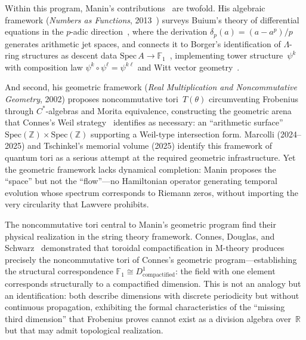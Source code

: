 Within this program, Manin's contributions~\cite{manin13,manin04} are
twofold.  His algebraic framework
(\emph{Numbers as Functions}, 2013~\cite{manin13}) surveys Buium's theory
of differential equations in the $p$-adic direction~\cite{buium05},
where the derivation $\delta_p(a) = (a - a^p)/p$ generates arithmetic
jet spaces, and connects it to Borger's identification of $\Lambda$-ring
structures as descent data
$\mathrm{Spec}\,A \to \mathbb{F}_1$~\cite{borger09}, implementing tower
structure~$\psi^k$ with composition law
$\psi^k \circ \psi^\ell = \psi^{k\ell}$ and Witt vector
geometry~\cite{borger11}.

And second, his geometric framework
(\emph{Real Multiplication and Noncommutative Geometry}, 2002) proposes
noncommutative tori~$T(\theta)$ circumventing Frobenius through
$C^*$-algebras and Morita equivalence, constructing the geometric arena
that Connes's Weil strategy~\cite{connes16} identifies as necessary:
an ``arithmetic surface''
$\mathrm{Spec}(\mathbb{Z}) \times \mathrm{Spec}(\mathbb{Z})$ supporting
a Weil-type intersection form.  Marcolli (2024--2025) and Tschinkel's
memorial volume (2025) identify this framework of quantum tori as a
serious attempt at the required geometric infrastructure.  Yet the
geometric framework lacks dynamical completion: Manin proposes the
``space'' but not the ``flow''---no Hamiltonian operator generating
temporal evolution whose spectrum corresponds to Riemann zeros, without
importing the very circularity that Lawvere prohibits.

The noncommutative tori central to Manin's geometric program find their
physical realization in the string theory framework.  Connes, Douglas,
and Schwarz~\cite{connes98} demonstrated that toroidal compactification in
M-theory produces precisely the noncommutative tori of Connes's
geometric program---establishing the structural correspondence
$\mathbb{F}_1 \cong D^1_{\text{compactified}}$: the field with one
element corresponds structurally to a compactified dimension.  This is
not an analogy but an identification: both describe dimensions with
discrete periodicity but without continuous propagation, exhibiting the
formal characteristics of the ``missing third dimension'' that Frobenius
proves cannot exist as a division algebra over~$\mathbb{R}$ but that
may admit topological realization.

